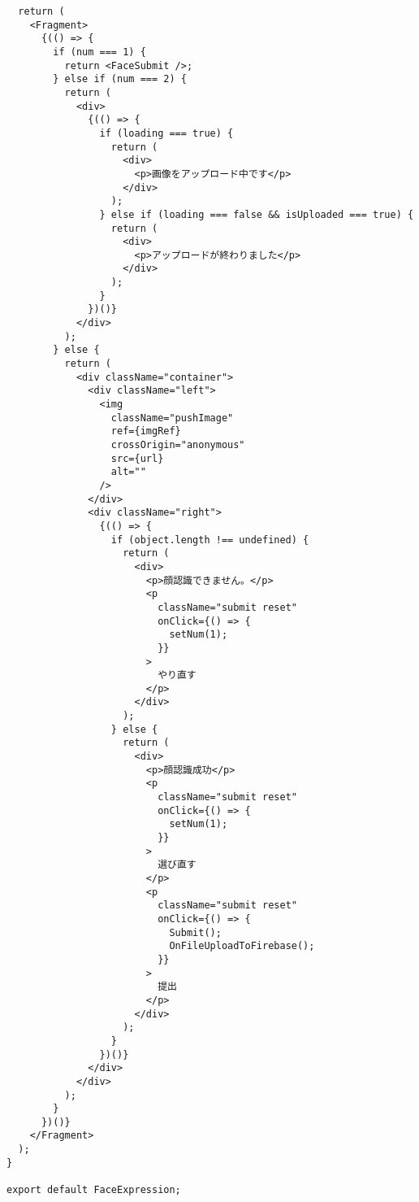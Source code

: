 \begin{verbatim}
  return (
    <Fragment>
      {(() => {
        if (num === 1) {
          return <FaceSubmit />;
        } else if (num === 2) {
          return (
            <div>
              {(() => {
                if (loading === true) {
                  return (
                    <div>
                      <p>画像をアップロード中です</p>
                    </div>
                  );
                } else if (loading === false && isUploaded === true) {
                  return (
                    <div>
                      <p>アップロードが終わりました</p>
                    </div>
                  );
                }
              })()}
            </div>
          );
        } else {
          return (
            <div className="container">
              <div className="left">
                <img
                  className="pushImage"
                  ref={imgRef}
                  crossOrigin="anonymous"
                  src={url}
                  alt=""
                />
              </div>
              <div className="right">
                {(() => {
                  if (object.length !== undefined) {
                    return (
                      <div>
                        <p>顔認識できません。</p>
                        <p
                          className="submit reset"
                          onClick={() => {
                            setNum(1);
                          }}
                        >
                          やり直す
                        </p>
                      </div>
                    );
                  } else {
                    return (
                      <div>
                        <p>顔認識成功</p>
                        <p
                          className="submit reset"
                          onClick={() => {
                            setNum(1);
                          }}
                        >
                          選び直す
                        </p>
                        <p
                          className="submit reset"
                          onClick={() => {
                            Submit();
                            OnFileUploadToFirebase();
                          }}
                        >
                          提出
                        </p>
                      </div>
                    );
                  }
                })()}
              </div>
            </div>
          );
        }
      })()}
    </Fragment>
  );
}

export default FaceExpression;

\end{verbatim}